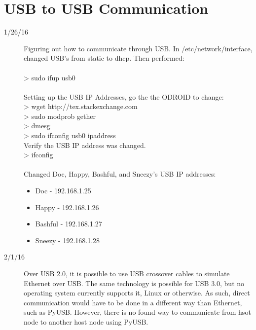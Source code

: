 \section{USB to USB Communication}
\begin{description}
\item [1/26/16] Figuring out how to communicate through USB. In /etc/network/interface, changed USB's from static to dhcp. Then performed: \\ \\ 
> sudo ifup usb0 \\ \\
Setting up the USB IP Addresses, go the the ODROID to change: \\
> wget http://tex.stackexchange.com \\
> sudo modprob g\textunderscore ether \\
> dmesg \\
> sudo ifconfig usb0 ipaddress \\

Verify the USB IP address was changed. \\
> ifconfig \\ \\
Changed Doc, Happy, Bashful, and Sneezy's USB IP addresses:
	\begin{itemize}
		\item Doc - 192.168.1.25
		\item Happy - 192.168.1.26
		\item Bashful - 192.168.1.27
		\item Sneezy - 192.168.1.28
	\end{itemize}
\item[2/1/16] Over USB 2.0, it is possible to use USB crossover cables to simulate Ethernet over USB. The same technology is possible for USB 3.0, but no operating system currently supports it, Linux or otherwise. As such, direct communication would have to be done in a different way than Ethernet, such as PyUSB. However, there is no found way to communicate from hsot node to another host node using PyUSB.
\end{description}

